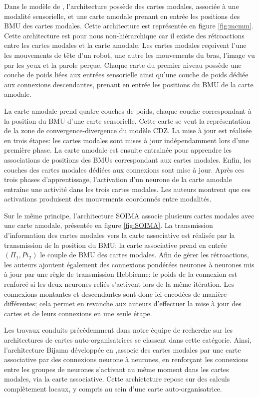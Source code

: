 \documentclass[../main]{subfiles}
\begin{document}
Dans le modèle de \cite{dominey13}, l'architecture possède des cartes modales, associée à une modalité sensorielle, et une carte amodale prenant en entrée les positions des BMU des cartes modales. Cette architecture est représentée en figure \ref{fig:mcmm}. Cette architecture est pour nous non-hiérarchique car il existe des rétroactions entre les cartes modales et la carte amodale.
Les cartes modales reçoivent l'une les mouvements de tête d'un robot, une autre les mouvements du bras, l'image vu par les yeux et la parole perçue.
Chaque carte du premier niveau possède une couche de poids liées aux entrées sensorielle ainsi qu'une couche de poids dédiée aux connexions descendantes, prenant en entrée les positions du BMU de la carte amodale.

La carte amodale prend quatre couches de poids, chaque couche correspondant à la position du BMU d'une carte sensorielle. Cette carte se veut la représentation de la zone de convergence-divergence du modèle CDZ.
La mise à jour est réalisée en trois étapes: les cartes modales sont mises à jour indépendamment lors d'une première phase. La carte amodale est ensuite entrainée pour apprendre les associations de positions des BMUs correspondant aux cartes modales. Enfin, les couches des cartes modales dédiées aux connexions sont mise à jour.
Après ces trois phases d'apprentissage, l'activation d'un neurone de la carte amodale entraîne une activité dans les trois cartes modales. Les auteurs montrent que ces activations produisent des mouvements coordonnés entre modalités.

Sur le même principe, l'architecture SOIMA \cite{escobar-juarez_self-organized_2016} associe plusieurs cartes modales avec une carte amodale, présentée en figure \ref{fig:SOIMA}.
La transmission d'information des cartes modales vers la carte associative est réalisée par la transmission de la position du BMU: la carte associative prend en entrée $(\Pi_1,Pi_2)$ le couple de BMU des cartes modales. Afin de gérer les rétroactions, les auteurs ajoutent également des connexions pondérées neurones à neurones mis à jour par une règle de transmission Hebbienne: le poids de la connexion est renforcé si les deux neurones reliés s'activent lors de la même itération. Les connexions montantes et descendantes sont donc ici encodées de manière différentes; cela permet en revanche aux auteurs d'effectuer la mise à jour des cartes et de leurs connexions en une seule étape.

Les travaux conduits précédemment dans notre équipe de recherche sur les architectures de cartes auto-organisatrices se classent dans cette catégorie.
Ainsi, l'architecture Bijama développée en \cite{menard05,khouzam_2013},associe des cartes modales par une carte associative par des connexions neurone à neurones, en renforçant les connexions entre les groupes de neurones s'activant au même moment dans les cartes modales, via la carte associative. Cette archietcture repose sur des calculs complètement locaux, y compris au sein d'une carte auto-organisatrice.
\end{document}
